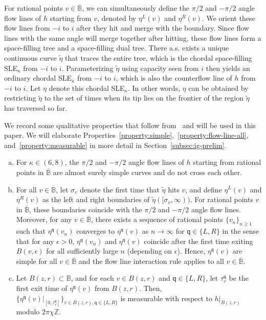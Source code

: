 \documentclass[a4paper]{article}
\numberwithin{equation}{section}
\numberwithin{equation}{section}
\renewcommand{\1}{\mathbf{1}}
\begin{document}
For rational points $v \in \overline{\mathbb{B}}$, we can simultaneously define the $\pi/2$ and $-\pi/2$ angle flow lines of $h$ starting from $v$, denoted by $\eta^L(v)$ and $\eta^R(v)$. We orient these flow lines from $-i$ to $i$ after they hit and merge with the boundary. Since flow lines with the same angle will merge together after hitting, these flow lines form a space-filling tree and a space-filling dual tree. There a.s. exists a unique continuous curve $\widetilde \eta$ that traces the entire tree, which is the chordal space-filling SLE$_\kappa$ from $-i$ to $i$. Parameterizing $\widetilde \eta$ using capacity seen from $i$ then yields an ordinary chordal SLE$_\kappa$ from $-i$ to $i$, which is also the counterflow line of $h$ from $-i$ to $i$. Let $\eta$ denote this chordal SLE$_\kappa$. In other words, $\eta$ can be obtained by restricting $\widetilde \eta$ to the set of times when its tip lies on the frontier of the region $\widetilde \eta$ has traversed so far.

We record some qualitative properties that follow from~\cite{IG4} and will be used in this paper. We will elaborate Properties~\eqref{property:simple},~\eqref{property:flow-line-all}, and~\eqref{property:measurable} in more detail in Section~\ref{subsec:ig-prelim}.

\begin{enumerate}[(a)]
    
    \item \label{property:simple} For $\kappa \in (6,8)$, the $\pi/2$ and $-\pi/2$ angle flow lines of $h$ starting from rational points in $\overline{\mathbb{B}}$ are almost surely simple curves and do not cross each other.

    \item \label{property:flow-line-all} For all $v \in \overline{\mathbb{B}}$, let $\sigma_v$ denote the first time that $\widetilde \eta$ hits $v$, and define $\eta^L(v)$ and $\eta^R(v)$ as the left and right boundaries of $\widetilde \eta([\sigma_v,\infty))$. For rational points $v$ in $\overline{\mathbb B}$, these boundaries coincide with the $\pi/2$ and $-\pi/2$ angle flow lines. Moreover, for any $v \in \overline{\mathbb{B}}$, there exists a sequence of rational points $\{v_n\}_{n \geq 1}$ such that $\eta^{\mathsf q}(v_n)$ converges to $\eta^{\mathsf q}(v)$ as $n \to \infty$ for $\mathsf q \in \{L,R\}$ in the sense that for any $\epsilon>0$, $\eta^{\mathsf q}(v_n)$ and $\eta^{\mathsf q}(v)$ coincide after the first time exiting $B(v,\epsilon)$ for all sufficiently large $n$ (depending on $\epsilon$). Hence, $\eta^{\mathsf q}(v)$ are simple for all $v \in \overline{\mathbb{B}}$ and the flow line interaction rule applies to all $v \in \overline{\mathbb{B}}$.

    \item \label{property:measurable} Let $B(z,r) \subset \mathbb{B}$, and for each $v \in B(z, r)$ and $\mathsf q \in \{L,R\}$, let $\tau_v^{\mathsf q}$ be the first exit time of $\eta^{\mathsf q}(v)$ from $B(z,r)$. Then, $\{\eta^{\mathsf q}(v)|_{[0,\tau_v^{\mathsf q}]}\}_{v \in B(z,r), \mathsf q \in \{L,R\}}$ is measurable with respect to $h|_{B(z,r)}$ modulo $2 \pi \chi \mathbb{Z}$.
\end{enumerate}
\end{document}
